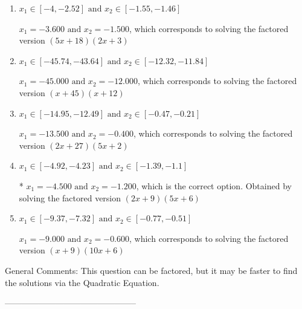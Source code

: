 \documentclass{article}[14pt]
\begin{document}
\begin{enumerate}[label=\Alph*.] 
\item $ x_1 \in [-4, -2.52] \text{ and } x_2 \in [-1.55, -1.46] $ 

 $x_1 = -3.600 \text{ and } x_2 = -1.500$, which corresponds to solving the factored version $(5x + 18)(2x + 3)$ 
\item $ x_1 \in [-45.74, -43.64] \text{ and } x_2 \in [-12.32, -11.84] $ 

 $x_1 = -45.000 \text{ and } x_2 = -12.000$, which corresponds to solving the factored version $(x + 45)(x + 12)$ 
\item $ x_1 \in [-14.95, -12.49] \text{ and } x_2 \in [-0.47, -0.21] $ 

 $x_1 = -13.500 \text{ and } x_2 = -0.400$, which corresponds to solving the factored version $(2x + 27)(5x + 2)$ 
\item $ x_1 \in [-4.92, -4.23] \text{ and } x_2 \in [-1.39, -1.1] $ 

 * $x_1 = -4.500 \text{ and } x_2 = -1.200$, which is the correct option. Obtained by solving the factored version $(2x + 9)(5x + 6)$ 
\item $ x_1 \in [-9.37, -7.32] \text{ and } x_2 \in [-0.77, -0.51] $ 

 $x_1 = -9.000 \text{ and } x_2 = -0.600$, which corresponds to solving the factored version $(x + 9)(10x + 6)$ 
\end{enumerate} 
 
General Comments: This question can be factored, but it may be faster to find the solutions via the Quadratic Equation.

-----------------------------------------------
\end{document}
